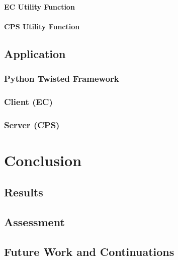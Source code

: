 \documentclass[a4paper, notitlepage]{report}
\begin{document}
\subsection{EC Utility Function}
\label{sec:org159d76a}
\subsection{CPS Utility Function}
\label{sec:org81c7396}
\chapter{Application}
\label{sec:orga954ad6}
\section{Python Twisted Framework}
\label{sec:org394186f}
\section{Client (EC)}
\label{sec:orgc081b60}
\section{Server (CPS)}
\label{sec:org7ee196f}
\part{Conclusion}
\label{sec:org747b790}
\chapter{Results}
\label{sec:org85cf67a}
\chapter{Assessment}
\label{sec:org15d5654}
\chapter{Future Work and Continuations}
\label{sec:orgc9b2650}
\printbibliography
\appendix
\end{document}
